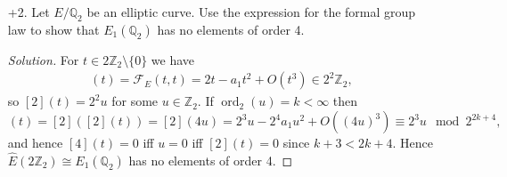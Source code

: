 \documentclass[a4paper]{article}
\theoremstyle{definition}
\DeclareMathOperator{\ord}{ord}
\newcommand{\series}[2]{#1[\![#2]\!]}
\newcommand{\calF}{\mathcal{F}}
\newcommand{\Z}{\mathbb{Z}}
\newcommand{\Q}{\mathbb{Q}}
\begin{document}
\begin{enumerate}
\begin{proof}[Solution]
\begin{equation*}
                -(t_1+t_2+t_3)
                    = \frac{a_2w_1+(a_1-a_2t_1+2w_1)d+(a_3-2t_1+3w_1)d^2-3t_1d^3}
                        {1+a_2d+a_4d^2+a_6d^3}.
            \end{equation*}
            Hence
            \begin{align*}
                -t_3
                    = t_1 + t_2 + a_1d + O(t_1,t_2)^3
                    = t_1 + t_2 + a_1(t_1^2+t_1t_2+t_2^2) + O(t_1,t_2)^3,
            \end{align*}
            and the $t$ coordinate $\calF_E(t_1,t_2)$ of the sum of the points
            is given by the inverse $\iota_E(t_3)$, where
            \begin{align*}
                \iota_E(t)
                    = \frac{x(t)}{y(t)+a_1x(t)+a_3}
                    = \frac{t-a_1t^2+O(t^3)}{-1+2a_1t+O(t^2)}
                    = -t - a_1t^2 + O(t^3),
            \end{align*}
            so
            \begin{align*}
                \calF_E(t_1,t_2)
                    &= t_1 + t_2 + a_1(t_1^2+t_1t_2+t_2^2) - a_1(t_1+t_2)^2
                        + O(t_1,t_2)^3 \\
                    &= t_1 + t_2 - a_1t_1t_2 + O(t_1,t_2)^3.
            \end{align*}
            (Here I wrote $O(t_1,t_2)^3$ to denote an element of the ideal
            $(t_1,t_2)^3\subseteq\series{\Q(a_1,\ldots,a_6)}{t_1,t_2}$ and
            similar.)
        \end{proof}

    \item[+2.]  Let $E/\Q_2$ be an elliptic curve. Use the expression for the
        formal group law to show that $E_1(\Q_2)$ has no elements of order 4.

        \begin{proof}[Solution]
            For $t\in2\Z_2\setminus\{0\}$ we have
            \begin{align*}
                [2](t) = \calF_E(t,t) = 2t - a_1t^2 + O(t^3) \in 2^2\Z_2,
            \end{align*}
            so $[2](t)=2^2u$ for some $u\in\Z_2$. If $\ord_2(u)=k<\infty$ then
            \begin{equation*}
                [4](t) = [2]([2](t)) = [2](4u) = 2^3u - 2^4a_1u^2 + O((4u)^3)
                    \equiv 2^3u\mod 2^{2k+4},
            \end{equation*}
            and hence $[4](t)=0$ iff $u=0$ iff $[2](t)=0$ since $k+3<2k+4$.
            Hence $\hat E(2\Z_2)\cong E_1(\Q_2)$ has no elements of order 4.
        \end{proof}


\end{enumerate}
\end{document}
